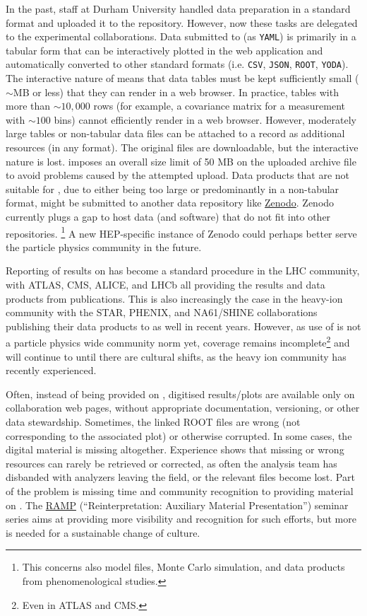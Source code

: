 \documentclass[11pt]{article}
\begin{document}
In the past, \hepdata staff at Durham University handled data preparation in a standard format and uploaded it to the repository.
However, now these tasks are delegated to the experimental collaborations.
Data submitted to \hepdata (as \texttt{YAML}) is primarily in a tabular form that can be interactively plotted in the web application and automatically converted to other standard formats (i.e. \texttt{CSV}, \texttt{JSON}, \texttt{ROOT}, \texttt{YODA}).
The interactive nature of \hepdata means that data tables must be kept sufficiently small ($\sim$MB or less) that they can render in a web browser.
In practice, tables with more than $\sim 10,000$ rows (for example, a covariance matrix for a measurement with $\sim 100$ bins) cannot efficiently render in a web browser.
However, moderately large tables or non-tabular data files can be attached to a \hepdata record as additional resources (in any format).
The original files are downloadable, but the interactive nature is lost.
\hepdata imposes an overall size limit of 50 MB on the uploaded archive file to avoid problems caused by the attempted upload. 
%
Data products that are not suitable for \hepdata, due to either being too large or predominantly in a non-tabular format, might be submitted to another data repository like \href{https://zenodo.org/}{Zenodo}.
Zenodo currently plugs a gap to host data (and software) that do not fit into other repositories.%
\footnote{This concerns also model files, Monte Carlo simulation, and data products from phenomenological studies.}
A new \gls{HEP}-specific instance of Zenodo could perhaps better serve the particle physics community in the future.


Reporting of results on \hepdata has become a standard procedure in the \gls{LHC} community, with \gls{ATLAS}, \gls{CMS}, \gls{ALICE}, and \gls{LHCb} all providing the results and data products from publications.
This is also increasingly the case in the heavy-ion community with the \gls{STAR}, \gls{PHENIX}, and NA61/SHINE collaborations publishing their data products to \hepdata as well in recent years.
However, as use of \hepdata is not a particle physics wide community norm yet, coverage remains incomplete\footnote{Even in \gls{ATLAS} and \gls{CMS}.} and will continue to until there are cultural shifts, as the heavy ion community has recently experienced.

Often, instead of being provided on \hepdata, digitised results/plots are available only on collaboration web pages, without appropriate documentation, versioning, or other data stewardship.
Sometimes, the linked ROOT files are wrong (not corresponding to the associated plot) or otherwise corrupted.
In some cases, the digital material is missing altogether.
Experience shows that missing or wrong resources can rarely be retrieved or corrected, as often the analysis team has disbanded with analyzers leaving the field, or the relevant files become lost. 
Part of the problem is missing time and community recognition to providing material on \hepdata.
The \href{https://indico.cern.ch/category/14155/}{RAMP} (``Reinterpretation: Auxiliary Material Presentation'') seminar series aims at providing more visibility and recognition for such efforts,  but more is needed for a 
sustainable change of culture. 
\end{document}
